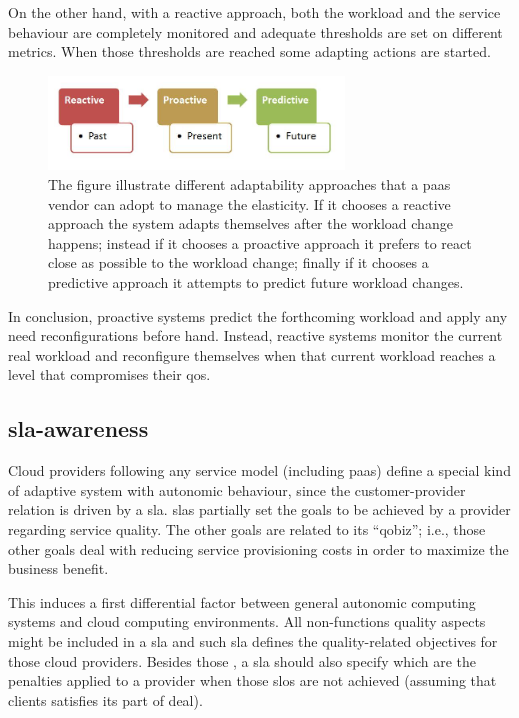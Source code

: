 On the other hand, with a reactive approach, both the workload and the service behaviour are completely
monitored and adequate thresholds are set on different metrics. When those thresholds are reached some
adapting actions are started.

\begin{figure}
	\centering{}
	\includegraphics[width=0.7\textwidth]{chapters/elasticity/images/adaptability.png}
	\caption[Different adaptability approaches]{The figure illustrate different adaptability approaches
		that a \ac{paas} vendor can adopt to manage the elasticity. If it chooses a reactive approach the
		system adapts themselves after the workload change happens; instead if it chooses a proactive approach
		it prefers to react close as possible to the workload change; finally if it chooses a predictive
		approach it attempts to predict future workload changes.}
	\label{img:elasticity-requirements-adaptability}
\end{figure}

In conclusion, proactive systems predict the forthcoming workload and apply any need reconfigurations
before hand. Instead, reactive systems monitor the current real workload and reconfigure themselves
when that current workload reaches a level that compromises their \ac{qos}.

\subsection{\acs{sla}-awareness}
\label{sec:elasticity-requirements-slaAwareness}
Cloud providers following any service model (including \ac{paas}) define a special kind of adaptive
system with autonomic behaviour, since the customer-provider relation is driven by a \ac{sla}.
\ac{sla}s partially set the goals to be achieved by a provider regarding service quality. The other
goals are related to its ``\ac{qobiz}''; i.e., those other goals deal with reducing service provisioning
costs in order to maximize the business benefit.

This induces a first differential factor between general autonomic computing systems and cloud computing
environments. All non-functions quality aspects might be included in a \ac{sla} and such \ac{sla} 
defines the quality-related objectives for those cloud providers. Besides those , a \ac{sla}
should also specify which are the penalties applied to a provider when those \ac{slo}s are not achieved
(assuming that clients satisfies its part of deal).

